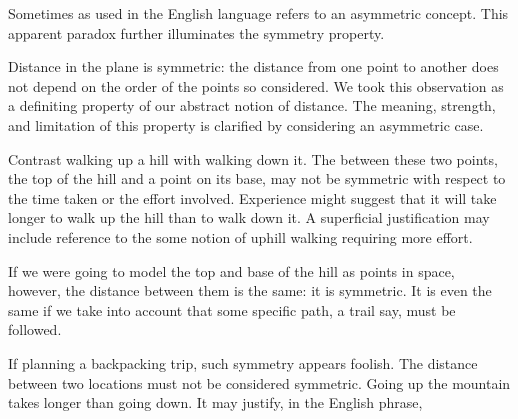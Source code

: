 \sbasic


\sstart



Sometimes 
as used in the English language
refers to an asymmetric  concept.
This apparent paradox further
illuminates the symmetry property.


Distance in the plane is
symmetric: the distance from
one point to another does
not depend on the order of the
points so considered.
We took this observation as
a definiting property
of our abstract notion
of distance.
The meaning, strength, and
limitation of
this property
is clarified by considering an
asymmetric case.

Contrast walking up a hill
with walking down it.
The  between these
two points, the top of the hill
and a point on its base,
may not be symmetric with respect to
the time taken or the effort involved.
Experience might suggest
that it will take longer
to walk up the hill
than to walk down it.
A superficial justification may
include reference to the some
notion of uphill walking requiring
more effort.

If we were going to model the top and
base of the hill
as points in space, however, the
distance between them is the same: it
is symmetric.
It is even the same if we take into
account that some specific path, a trail
say, must be followed.

If planning a backpacking trip,
such symmetry appears foolish.
The distance between two
locations must not be considered
symmetric.
Going up the mountain takes longer
than going down.
It may justify, in the English
phrase, 


\strats
